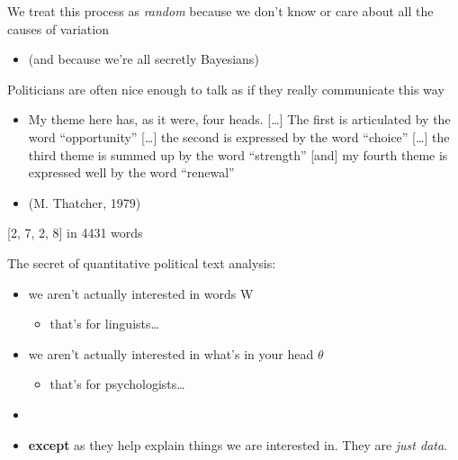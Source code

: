 \documentclass[11pt,compress,professionalfonts]{beamer}
\newcommand{\ita}{\begin{itemize}}
\newcommand{\itm}{\item[]}
\newcommand{\itz}{\end{itemize}}
\begin{document}
We treat this process as \textsl{random} because we don't know or care about all the causes of variation
\ita
\itm (and because we're all secretly Bayesians)
\itz

%
%
%
%


Politicians are often nice enough to talk as if they really communicate this way

\ita
\itm My theme here has, as it were, four heads. [\ldots] The first is articulated by the word ``opportunity'' [\ldots] the second is expressed by the word ``choice'' [\ldots] the third theme is summed up by the word ``strength'' [and] my fourth theme is expressed well by the word ``renewal''
\itm (M. Thatcher, 1979)
\itz

[2, 7, 2, 8] in 4431 words


The secret of quantitative political text analysis:
\ita
\itm we aren't actually interested in words W
\ita
\itm that's for linguists\ldots
\itz
\itm we aren't actually interested in what's in your head $\theta$
\ita
\itm that's for psychologists\ldots
\itz
\itm 
\itm \textbf{except} as they help explain things we are interested in.  They are \textit{just data}.
\itz  


%
%
%
\end{document}
